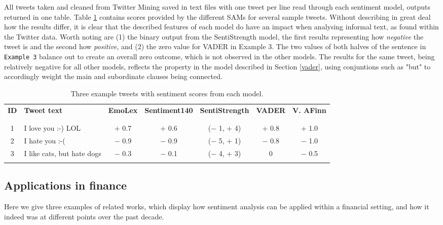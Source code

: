 \documentclass{article}
\begin{document}
All tweets taken and cleaned from Twitter Mining saved in text files with one tweet per line read through each sentiment model, outputs returned in one table. Table \ref{tab:tweet-examples} contains scores provided by the different SAMs for several sample tweets. Without describing in great deal how the results differ, it is clear that the described features of each model do have an impact when analysing informal text, as found within the Twitter data. Worth noting are (1) the binary output from the SentiStrength model, the first results representing how \emph{negative} the tweet is and the second how \emph{positive}, and (2) the zero value for VADER in Example 3. The two values of both halves of the sentence in \texttt{Example 3} balance out to create an overall zero outcome, which is not observed in the other models. The results for the same tweet, being relatively negative for all other models, reflects the property in the model described in Section \ref{vader}, using conjuntions such as "but" to accordingly weight the main and subordinate clauses being connected. 

\begin{table}[htb]
\centering
\begin{tabular}{clccccc}
\textbf{ID} & \textbf{Tweet text} & \textbf{EmoLex} & \textbf{Sentiment140} & \textbf{SentiStrength} & \textbf{VADER} & \textbf{V. AFinn}\\
 &  &  &  &  &  & \\
\hline
 &  &  &  &  &  & \\
1 & I love you :-) LOL & $+$ 0.7 & $+$ 0.6 & ($-$ 1, $+$ 4) & $+$ 0.8 & $+$ 1.0\\
2 & I hate you :-( & $-$ 0.9 & $-$ 0.9 & ($-$ 5, $+$ 1) & $-$ 0.8 & $-$ 1.0\\
3 & I like cats, but hate dogs & $-$ 0.3 & $-$ 0.1 & ($-$ 4, $+$ 3) & 0 & $-$ 0.5\\
 &  &  &  &  &  & \\
\end{tabular}\caption{\label{tab:tweet-examples}Three example tweets with sentiment scores from each model.}

\end{table}


\subsection{Applications in finance}
\label{sec-1-5}

Here we give three examples of related works, which display how sentiment analysis can be applied within a financial setting, and how it indeed was at different points over the past decade.
\end{document}
